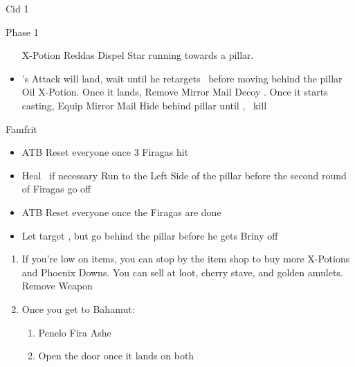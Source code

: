 \begin{battle}{Cid 1 \item  Phase 1}
	\begin{itemize}
		\battlewait
		\penelof X-Potion Reddas
		\ashef Dispel 
		\vaanf Star running towards a pillar.
		\item {}'s Attack will land, wait until he retargets \vaan\ before moving behind the pillar
		\penelof Oil 
		\vaanf X-Potion. Once it lands, Remove Mirror Mail
		\ashef Decoy \vaan. Once it starts casting, Equip Mirror Mail
		\vaanf Hide behind pillar until \ashe, \penelo\ kill 
	\end{itemize}
\end{battle}
\begin{battle}{Famfrit}
\begin{itemize}
	\vaanf Flee to the Right Pillar
	\ashef Dispell 
	\item ATB Reset everyone once 3 Firagas hit 
	\item Heal \vaan\ if necessary
	\vaanf Run to the Left Side of the pillar before the second round of Firagas go off
	\beliasfreeze{}
	\item ATB Reset everyone once the Firagas are done
	\item Let  target \vaan, but go behind the pillar before he gets Briny off
\end{itemize}
\end{battle}
\begin{enumerate}[resume]
\item If you're low on items, you can stop by the item shop to buy more X-Potions and Phoenix Downs. You can sell at loot, cherry stave, and golden amulets.
\penelof Remove Weapon
\item Once you get to Bahamut:
\begin{enumerate}
\item \GirlsGambitOff
\penelof Penelo Fira Ashe
\item Open the door once it lands on both
\end{enumerate}
\end{enumerate}
\begin{menu}
\party{\vaan}
\begin{itemize}
\battleslow
\end{itemize}
\end{menu}
